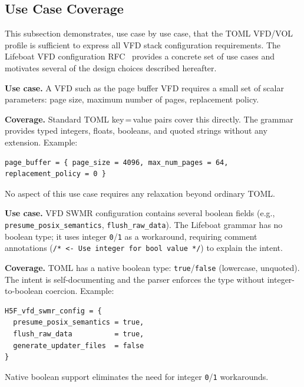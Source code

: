 \documentclass[../RFC-HDFG-2026-001.tex]{subfiles}
\begin{document}
\subsection{Use Case Coverage}
\label{sec:vfd-use-cases}

This subsection demonstrates, use case by use case, that the TOML VFD/VOL
profile is sufficient to express all VFD stack configuration requirements.
The Lifeboat VFD configuration RFC~\cite{lifeboat-vfd-cl} provides a concrete
set of use cases and motivates several of the design choices described hereafter.


\textbf{Use case.}  A VFD such as the page buffer VFD requires a small set of
scalar parameters: page size, maximum number of pages, replacement policy.

\textbf{Coverage.}  Standard TOML key\,=\,value pairs cover this
directly.  The grammar provides typed integers, floats, booleans, and quoted
strings without any extension.  Example:

\begin{verbatim}
page_buffer = { page_size = 4096, max_num_pages = 64, replacement_policy = 0 }
\end{verbatim}

No aspect of this use case requires any relaxation beyond ordinary TOML.


\textbf{Use case.}  VFD SWMR configuration contains several boolean fields
(e.g., \texttt{presume\_posix\_semantics}, \texttt{flush\_raw\_data}).  The
Lifeboat grammar has no boolean type; it uses integer \texttt{0}/\texttt{1}
as a workaround, requiring comment annotations (\texttt{/* <- Use integer for
bool value */}) to explain the intent.

\textbf{Coverage.}  TOML has a native boolean type:
\texttt{true}/\texttt{false} (lowercase, unquoted).  The intent is
self-documenting and the parser enforces the type without integer-to-boolean
coercion.  Example:

\begin{verbatim}
H5F_vfd_swmr_config = {
  presume_posix_semantics = true,
  flush_raw_data          = true,
  generate_updater_files  = false
}
\end{verbatim}

Native boolean support eliminates the need for integer \texttt{0}/\texttt{1} workarounds.

\end{document}
